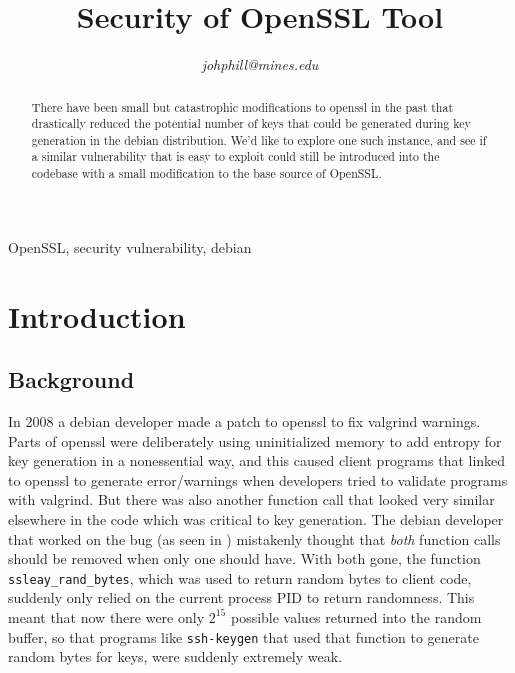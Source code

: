 \documentclass[conference]{IEEEtran}
\begin{document}
\title{Security of OpenSSL Tool}

\author{
\textit{johphill@mines.edu}\\
\and
{}
\and
{}
\and
{}
\and
{}
\and
{}
}

\maketitle

\begin{abstract}
There have been small but catastrophic modifications to openssl in the
past\cite{1}\cite{2} that drastically reduced the potential number of
keys that could be generated during key generation in the debian
distribution. We'd like to explore one such instance, and see if a
similar vulnerability that is easy to exploit could still be
introduced into the codebase with a small modification to the base
source of OpenSSL.
\end{abstract}

\begin{IEEEkeywords}
OpenSSL, security vulnerability, debian
\end{IEEEkeywords}

\section{Introduction}
\subsection{Background}
In 2008 a debian developer made a patch to openssl to fix valgrind
warnings\cite{2}\cite{3}. Parts of openssl were deliberately using
uninitialized memory to add entropy for key generation in a
nonessential way, and this caused client programs that linked to
openssl to generate error/warnings when developers tried to validate
programs with valgrind. But there was also another function call that
looked very similar elsewhere in the code which was critical to key
generation. The debian developer that worked on the bug (as seen in
\cite{2}) mistakenly thought that \emph{both} function calls should be
removed when only one should have. With both gone, the function
\verb|ssleay_rand_bytes|, which was used to return random bytes to
client code, suddenly only relied on the current process PID to return
randomness. This meant that now there were only $2^{15}$ possible
values returned into the random buffer, so that programs like
\verb|ssh-keygen| that used that function to generate random bytes for
keys, were suddenly extremely weak.
\end{document}
